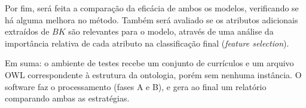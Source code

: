 Por fim, será feita a comparação da eficácia de ambos os modelos, verificando se há alguma melhora no método. Também será avaliado se os atributos adicionais extraídos de $BK$ são relevantes para o modelo, através de uma análise da importância relativa de cada atributo na classificação final (\textit{feature selection}).

Em suma: o ambiente de testes recebe um conjunto de currículos e um arquivo OWL correspondente à estrutura da ontologia, porém sem nenhuma instância. O software faz o processamento (fases A e B), e gera ao final um relatório comparando ambas as estratégias.
